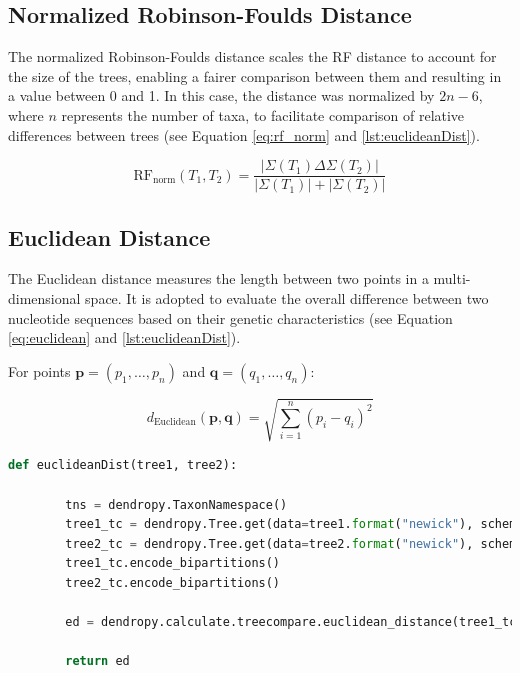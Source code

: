 \subsection{Normalized Robinson-Foulds Distance}\label{RFnorm}
The normalized Robinson-Foulds distance scales the RF distance to account for the size of the trees, enabling a fairer comparison between them and resulting in a value between 0 and 1. In this case, the distance was normalized by $2n-6$, where $n$ represents the number of taxa, to facilitate comparison of relative differences between trees (see Equation \eqref{eq:rf_norm} and \autoref{lst:euclideanDist}).

\begin{equation}\label{eq:rf_norm}
    \text{RF}_{\text{norm}}(T_1, T_2) = \frac{| \Sigma(T_1) \Delta \Sigma(T_2) |}{| \Sigma(T_1) | + | \Sigma(T_2) |}
\end{equation}

\subsection{Euclidean Distance}\label{euclidean}
The Euclidean distance measures the length between two points in a multi-dimensional space. It is adopted to evaluate the overall difference between two nucleotide sequences based on their genetic characteristics (see Equation \eqref{eq:euclidean} and \autoref{lst:euclideanDist}).

For points $\mathbf{p} = (p_1, \ldots, p_n)$ and $\mathbf{q} = (q_1, \ldots, q_n)$:

\begin{equation}\label{eq:euclidean}
    d_{\text{Euclidean}}(\mathbf{p}, \mathbf{q}) = \sqrt{\sum_{i=1}^{n} (p_i - q_i)^2}
\end{equation}

\begin{lstlisting}[label=lst:euclideanDist,language=Python,caption=Python script for calculating the Euclidean distance using the ete3 package in the aPhyloGeo package]
    def euclideanDist(tree1, tree2):
        
        tns = dendropy.TaxonNamespace()
        tree1_tc = dendropy.Tree.get(data=tree1.format("newick"), schema="newick", taxon_namespace=tns)
        tree2_tc = dendropy.Tree.get(data=tree2.format("newick"), schema="newick", taxon_namespace=tns)
        tree1_tc.encode_bipartitions()
        tree2_tc.encode_bipartitions()

        ed = dendropy.calculate.treecompare.euclidean_distance(tree1_tc, tree2_tc)

        return ed
\end{lstlisting}

